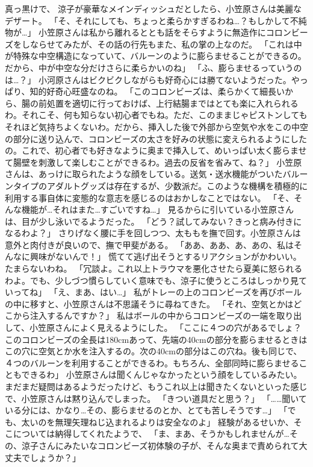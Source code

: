 真っ黒けで、
涼子が豪華なメインディッシュだとしたら、小笠原さんは美麗なデザート。
「そ、それにしても、ちょっと柔らかすぎるわね…？もしかして不純物が…」
小笠原さんは私から離れるととも話をそらすように無造作にコロンビーズをしならせてみたが、その話の行先もまた、私の掌の上なのだ。
「これは中が特殊な中空構造になっていて、バルーンのように膨らませることができるの。だから、中が中空な分だけさらに柔らかいのね」
「ふ、膨らませるっていうのは…？」
小河原さんはビクビクしながらも好奇心には勝てないようだった。やっぱり、知的好奇心旺盛なのね。
「このコロンビーズは、柔らかくて細長いから、腸の前処置を適切に行っておけば、上行結腸まではとても楽に入れられるわ。それこそ、何も知らない初心者でもね。ただ、このままじゃピストンしてもそれほど気持ちよくないわ。だから、挿入した後で外部から空気や水をこの中空の部分に送り込んで、コロンビーズの太さを好みの状態に変えられるようにしたの。これで、初心者でも好きなように奥まで挿入して、めいっぱい太く膨らませて腸壁を刺激して楽しむことができるわ。過去の反省を省みて、ね？」
小笠原さんは、あっけに取られたような顔をしている。送気・送水機能がついたバルーンタイプのアダルトグッズは存在するが、少数派だ。このような機構を積極的に利用する事自体に変態的な意志を感じるのはおかしなことではない。
「そ、そんな機能が…それはまた…すごいですね…」
見るからに引いている小笠原さんは、目が少し泳いでるようだった。
「どう？試してみない？きっと病み付きになるわよ？」
さりげなく腰に手を回しつつ、太ももを撫で回す。小笠原さんは意外と肉付きが良いので、撫で甲斐がある。
「ああ、ああ、あ、あの、私はそんなに興味がないんで！」
慌てて逃げ出そうとするリアクションがかわいい。たまらないわね。
「冗談よ。これ以上トラウマを悪化させたら夏美に怒られるわよ。でも、少しづつ慣らしていく意味でも、涼子に使うところはしっかり見ていってね」
「え、まあ、はい…」
私がトレーの上のコロンビーズを再びボールの中に移すと、小笠原さんは不思議そうに尋ねてきた。
「それ、空気とかはどこから注入するんですか？」
私はボールの中からコロンビーズの一端を取り出して、小笠原さんによく見えるようにした。
「ここに４つの穴があるでしょ？このコロンビーズの全長は180cmあって、先端の40cmの部分を膨らませるときはこの穴に空気とか水を注入するの。次の40cmの部分はこの穴ね。後も同じで、４つのバルーンを利用することができるわ。もちろん、全部同時に膨らませることもできるわ」
小笠原さんは聞くんじゃなかったという顔をしているみたい。
まだまだ疑問はあるようだったけど、もうこれ以上は聞きたくないといった感じで、小笠原さんは黙り込んでしまった。
「きつい道具だと思う？」
「……聞いている分には、かなり…その、膨らませるのとか、とても苦しそうです…」
「でも、太いのを無理矢理ねじ込まれるよりは安全なのよ」
経験があるせいか、そこについては納得してくれたようで、
「ま、まあ、そうかもしれませんが…その、涼子さんにみたいなコロンビーズ初体験の子が、そんな奥まで責められて大丈夫でしょうか？」
